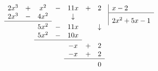 \documentclass{article}
\begin{document}
\setlength{\arraycolsep}{2pt}
\renewcommand{\arraystretch}{1.1}

\[
\begin{array}[t]{ccccccc}
  2x^3 & + & x^2  & - & 11x & + & 2 \\
  2x^3  & - & 4x^2 &   & \downarrow & & \\
  \cline{1-3}
  \noalign{\vskip 3pt}
        &   & 5x^2  & - & 11x &   & \downarrow \\
        &   & 5x^2  & - & 10x &   & \\
  \cline{3-5}
  \noalign{\vskip 3pt}
        &   &       &   & -x  & + & 2 \\
        &   &       &   & -x  & + & 2 \\
  \cline{5-7}
  \noalign{\vskip 3pt}
        &   &       &   &     &   & 0
\end{array}
\enskip
\begin{array}[t]{|@{\enskip}l}
  x-2 \\
  \hline
  \rule{0pt}{14pt}2x^2+5x-1
\end{array}
\]
\end{document}
